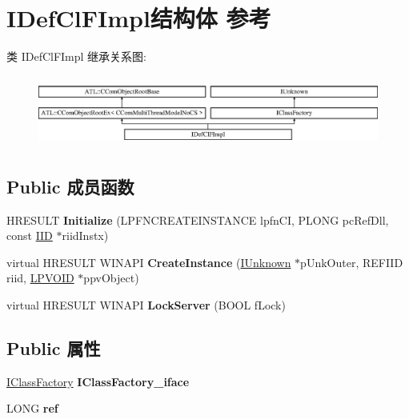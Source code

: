 \hypertarget{class_i_def_cl_f_impl}{}\section{I\+Def\+Cl\+F\+Impl结构体 参考}
\label{class_i_def_cl_f_impl}
类 I\+Def\+Cl\+F\+Impl 继承关系图\+:\begin{figure}[H]
\begin{center}
\leavevmode
\includegraphics[height=2.386364cm]{class_i_def_cl_f_impl}
\end{center}
\end{figure}
\subsection*{Public 成员函数}
\begin{DoxyCompactItemize}
\item 
\mbox{\label{class_i_def_cl_f_impl_aa3bbbf918b2635b6feb2f776ab44f66b}} 
H\+R\+E\+S\+U\+LT {\bfseries Initialize} (L\+P\+F\+N\+C\+R\+E\+A\+T\+E\+I\+N\+S\+T\+A\+N\+CE lpfn\+CI, P\+L\+O\+NG pc\+Ref\+Dll, const \hyperlink{struct___i_i_d}{I\+ID} $\ast$riid\+Instx)
\item 
\mbox{\label{class_i_def_cl_f_impl_a7b5b62bf14bb90af19b3f68332f5cf0c}} 
virtual H\+R\+E\+S\+U\+LT W\+I\+N\+A\+PI {\bfseries Create\+Instance} (\hyperlink{interface_i_unknown}{I\+Unknown} $\ast$p\+Unk\+Outer, R\+E\+F\+I\+ID riid, \hyperlink{interfacevoid}{L\+P\+V\+O\+ID} $\ast$ppv\+Object)
\item 
\mbox{\label{class_i_def_cl_f_impl_a03550cc9d85de4af05fee70b2a9a9da2}} 
virtual H\+R\+E\+S\+U\+LT W\+I\+N\+A\+PI {\bfseries Lock\+Server} (B\+O\+OL f\+Lock)
\end{DoxyCompactItemize}
\subsection*{Public 属性}
\begin{DoxyCompactItemize}
\item 
\mbox{\label{class_i_def_cl_f_impl_a233b5df4fd7f27153aa99acc617a3dec}} 
\hyperlink{interface_i_class_factory}{I\+Class\+Factory} {\bfseries I\+Class\+Factory\+\_\+iface}
\item 
\mbox{\label{class_i_def_cl_f_impl_a483f1e7b87635a55186cc3eee6d15269}} 
L\+O\+NG {\bfseries ref}
\end{DoxyCompactItemize}

